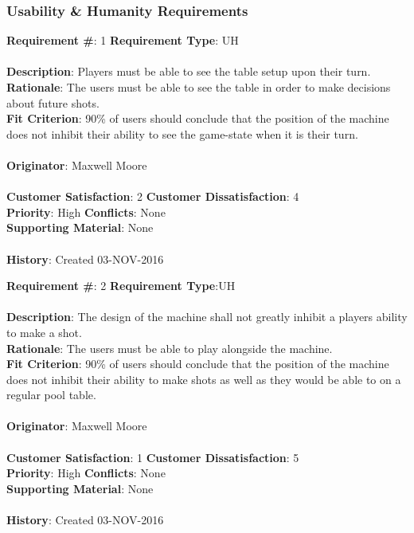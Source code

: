 \documentclass[titlepage]{article}
\begin{document}
\subsubsection{Usability \& Humanity Requirements}
\begin{framed}
	\noindent\textbf{Requirement \#}: 1 \hfill \textbf{Requirement Type}: UH \hfill\\\\
	\noindent\textbf{Description}: Players must be able to see the table setup upon their turn.\\
	\textbf{Rationale}: The users must be able to see the table in order to make decisions about future shots.\\
	\textbf{Fit Criterion}: 90\% of users should conclude that the position of the machine does not inhibit their ability to see the game-state when it is their turn.\\\\
	\textbf{Originator}: Maxwell Moore\\\\
	\noindent\textbf{Customer Satisfaction}: 2 \hfill 	\textbf{Customer Dissatisfaction}: 4 \hfill\\
	\textbf{Priority}: High \hfill \textbf{Conflicts}: None \hfill\\
	\textbf{Supporting Material}: None\\\\
	\noindent\textbf{History}: Created 03-NOV-2016
\end{framed}

\begin{framed}
	\noindent\textbf{Requirement \#}: 2 \hfill \textbf{Requirement Type}:UH \hfill\\\\
	\noindent\textbf{Description}: The design of the machine shall not greatly inhibit a players ability to make a shot.\\
	\textbf{Rationale}: The users must be able to play alongside the machine.\\
	\textbf{Fit Criterion}: 90\% of users should conclude that the position of the machine does not inhibit their ability to make shots as well as they would be able to on a regular pool table.\\\\
	\textbf{Originator}: Maxwell Moore\\\\
	\noindent\textbf{Customer Satisfaction}: 1 \hfill 	\textbf{Customer Dissatisfaction}: 5 \hfill\\
	\textbf{Priority}: High \hfill \textbf{Conflicts}: None \hfill\\
	\textbf{Supporting Material}: None\\\\
	\noindent\textbf{History}: Created 03-NOV-2016
\end{framed}
\end{document}
